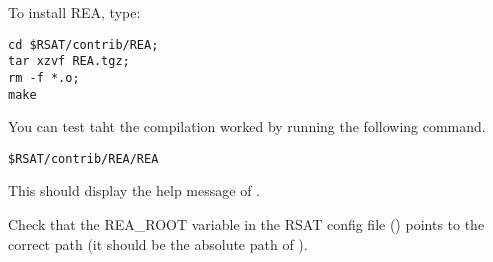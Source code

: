 \documentclass[12pt,a4paper, oneside]{scrreprt} %
\begin{document}
To install REA, type:

\begin{lstlisting}
cd $RSAT/contrib/REA; 
tar xzvf REA.tgz; 
rm -f *.o; 
make
\end{lstlisting}

You can test taht the compilation worked by running the following
command.

\begin{lstlisting}
$RSAT/contrib/REA/REA
\end{lstlisting}

This should display the help message of .

Check that the REA\_ROOT variable in the RSAT config file
() points to the correct path (it
should be the absolute path of ).






\end{document}
